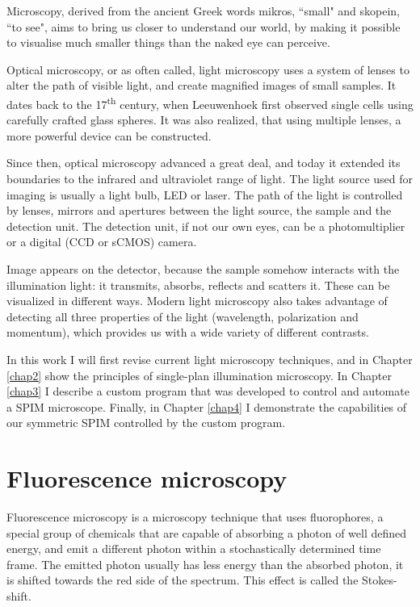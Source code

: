 \documentclass{diploma_style}
\begin{document}
Microscopy, derived from the ancient Greek words mikros, ``small" and skopein, ``to see", aims to bring us closer to understand our world, by making it possible to visualise much smaller things than the naked eye can perceive.

Optical microscopy, or as often called, light microscopy uses a system of lenses to alter the path of visible light, and create magnified images of small samples. It dates back to the 17\textsuperscript{th} century, when Leeuwenhoek first observed single cells using carefully crafted glass spheres. It was also realized, that using multiple lenses, a more powerful device can be constructed.

Since then, optical microscopy advanced a great deal, and today it extended its boundaries to the infrared and ultraviolet range of light. The light source used for imaging is usually a light bulb, LED or laser. The path of the light is controlled by lenses, mirrors and apertures between the light source, the sample and the detection unit. The detection unit, if not our own eyes, can be a photomultiplier or a digital (CCD or sCMOS) camera.

Image appears on the detector, because the sample somehow interacts with the illumination light: it transmits, absorbs, reflects and scatters it. These can be visualized in different ways. Modern light microscopy also takes advantage of detecting all three properties of the light (wavelength, polarization and momentum), which provides us with a wide variety of different contrasts.

In this work I will first revise current light microscopy techniques, and in Chapter \ref{chap2} show the principles of single-plan illumination microscopy. In Chapter \ref{chap3} I describe a custom program that was developed to control and automate a SPIM microscope. Finally, in Chapter \ref{chap4} I demonstrate the capabilities of our symmetric SPIM controlled by the custom program.


\section{Fluorescence microscopy}
Fluorescence microscopy \cite{lichtman_fluorescence_2005} is a microscopy technique that uses fluorophores, a special group  of chemicals that are capable of absorbing a photon of well defined energy, and emit a different photon within a stochastically determined time frame. The emitted photon usually has less energy than the absorbed photon, it is shifted towards the red side of the spectrum. This effect is called the Stokes-shift.
\end{document}
